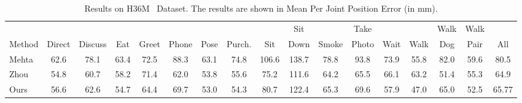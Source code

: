 \documentclass[runningheads]{llncs}
\begin{document}
\begin{table}[t]
\scriptsize
{}
\end{table}
\begin{table}[t]
\tiny
\centering
\renewcommand{\tabcolsep}{1pt}
\begin{tabular}{l|c|c|c|c|c|c|c|c|c|c|c|c|c|c|c|c}
\hline
                &        &         &        &       &       &        &        &         & Sit   &       & Take  &       &       & Walk  & Walk  & \multicolumn{1}{l}{} \\
\multicolumn{1}{c|}{Method}                      & Direct & Discuss & Eat & Greet & Phone & Pose & Purch. & Sit & Down  & Smoke & Photo & Wait  & Walk  & Dog   & Pair  & All                  \\ \hline 
Mehta~\cite{VNect_SIGGRAPH2017}  &62.6 & 78.1 & 63.4 & 72.5 & 88.3 & 63.1 & 74.8 & 106.6 & 138.7 & 78.8 & 93.8 & 73.9 & 55.8 & 82.0& 59.6 & 80.5\\
Zhou~\cite{Zhou_2017_ICCV}     & 54.8   & 60.7   & 58.2   & 71.4 & 62.0 & 53.8  & 55.6  & 75.2 & 111.6 & 64.2 & 65.5  &  66.1 & 63.2  & 51.4 & 55.3  & 64.9                \\
Ours  & 56.6    &  62.6    &     54.7 & 64.4   & 69.7 & 53.0  & 54.3    & 80.7 &122.4  & 65.3 &69.6  & 57.9  & 47.0 & 65.0  & 52.5  & 65.77 \\
\hline
\end{tabular}
{\caption{Results on H36M~\cite{h36m_pami} Dataset. The results are shown in Mean Per Joint Position Error (in mm).}\label{Table:H36M}}

\vspace{-0.3cm}
\end{table}
\end{document}
